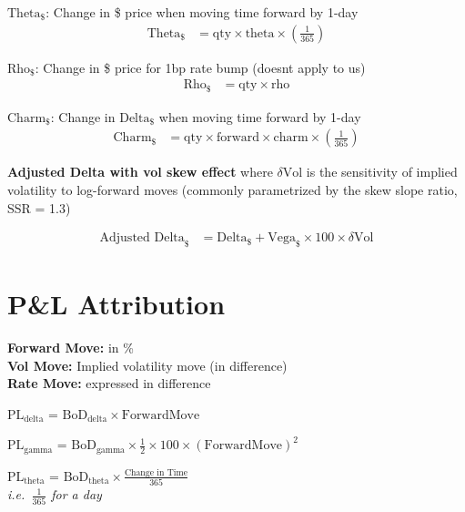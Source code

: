 \documentclass{article}
\begin{document}
\noindent \textbf{$\text{Theta}_{\$}$}: Change in \$ price when moving time forward by 1-day
\begin{align*}
\text{Theta}_{\$} &= \text{qty} \times \text{theta} \times \left( \frac{1}{365} \right)
\end{align*}

\noindent \textbf{$\text{Rho}_{\$}$}: Change in \$ price for 1bp rate bump (doesnt apply to us)
\begin{align*}
\text{Rho}_{\$} &= \text{qty} \times \text{rho}
\end{align*}

\noindent \textbf{$\text{Charm}_{\$}$}: Change in $\text{Delta}_{\$}$ when moving time forward by 1-day
\begin{align*}
\text{Charm}_{\$} &= \text{qty} \times \text{forward} \times \text{charm} \times \left( \frac{1}{365} \right)
\end{align*}

\noindent \textbf{Adjusted Delta with vol skew effect} where $\delta \text{Vol}$ is the sensitivity of implied volatility to log-forward moves (commonly parametrized by the skew slope ratio, SSR = 1.3)

\begin{align*}
\text{Adjusted Delta}_{\$} &= \text{Delta}_{\$} + \text{Vega}_{\$} \times 100 \times \delta \text{Vol}
\end{align*}

\section*{P\&L Attribution}

\textbf{Forward Move:} in \% \\
\textbf{Vol Move:} Implied volatility move (in difference) \\
\textbf{Rate Move:} expressed in difference

\vspace{1.5em}
\noindent \textbf{$\mathrm{PL}_{\text{delta}}$} = $\mathrm{BoD}_{\text{delta}} \times \text{ForwardMove}$ \\
\textit{ }

\vspace{0.5em}
\noindent \textbf{$\mathrm{PL}_{\text{gamma}}$} = $\mathrm{BoD}_{\text{gamma}} \times \frac{1}{2} \times 100 \times (\text{ForwardMove})^2$ \\
\textit{ }

\vspace{0.5em}
\noindent \textbf{$\mathrm{PL}_{\text{theta}}$} = $\mathrm{BoD}_{\text{theta}} \times \frac{\text{Change in Time}}{365}$ \\
\textit{i.e.\ $\frac{1}{365}$ for a day}
\textit{ }
\end{document}
